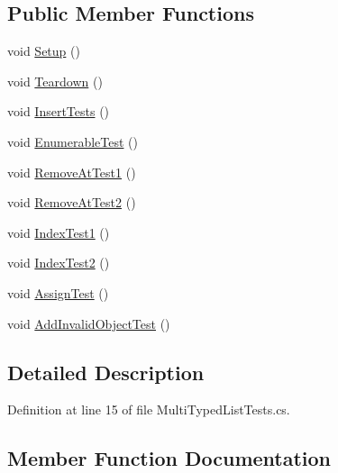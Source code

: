 \subsection*{Public Member Functions}
\begin{DoxyCompactItemize}
\item 
void \mbox{\hyperlink{class_leap_1_1_unity_1_1_tests_1_1_multi_typed_list_tests_a27a72c13752661f9add82375dcc06830}{Setup}} ()
\item 
void \mbox{\hyperlink{class_leap_1_1_unity_1_1_tests_1_1_multi_typed_list_tests_abb37d7aef9813348c4dc7a8628570e44}{Teardown}} ()
\item 
void \mbox{\hyperlink{class_leap_1_1_unity_1_1_tests_1_1_multi_typed_list_tests_af604b90f1b0aa0ad1a091604f65a197c}{Insert\+Tests}} ()
\item 
void \mbox{\hyperlink{class_leap_1_1_unity_1_1_tests_1_1_multi_typed_list_tests_a57f2fc72968e11d119b250d4294c836f}{Enumerable\+Test}} ()
\item 
void \mbox{\hyperlink{class_leap_1_1_unity_1_1_tests_1_1_multi_typed_list_tests_a127d0c279c27fac41ad8e95811f0ba84}{Remove\+At\+Test1}} ()
\item 
void \mbox{\hyperlink{class_leap_1_1_unity_1_1_tests_1_1_multi_typed_list_tests_a6c2b2ebcdc9e5b0adf49e28f3896d1fb}{Remove\+At\+Test2}} ()
\item 
void \mbox{\hyperlink{class_leap_1_1_unity_1_1_tests_1_1_multi_typed_list_tests_a7d43113a447580147d5d7ec9550e017f}{Index\+Test1}} ()
\item 
void \mbox{\hyperlink{class_leap_1_1_unity_1_1_tests_1_1_multi_typed_list_tests_ac796b65a0af06247f3525947b58f2e4f}{Index\+Test2}} ()
\item 
void \mbox{\hyperlink{class_leap_1_1_unity_1_1_tests_1_1_multi_typed_list_tests_a5e1c771c9f6a127947ded55b42e4101c}{Assign\+Test}} ()
\item 
void \mbox{\hyperlink{class_leap_1_1_unity_1_1_tests_1_1_multi_typed_list_tests_a7ccf200faac9c14d44c01f7eac410778}{Add\+Invalid\+Object\+Test}} ()
\end{DoxyCompactItemize}


\subsection{Detailed Description}


Definition at line 15 of file Multi\+Typed\+List\+Tests.\+cs.



\subsection{Member Function Documentation}
\mbox{\label{class_leap_1_1_unity_1_1_tests_1_1_multi_typed_list_tests_a7ccf200faac9c14d44c01f7eac410778}} 
